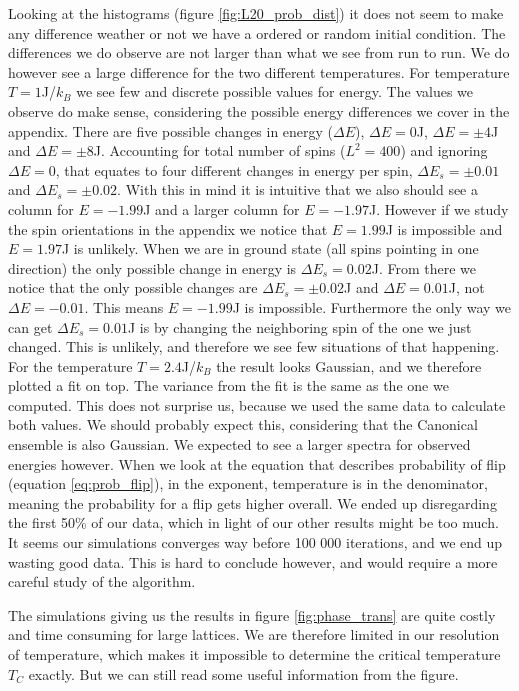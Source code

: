 \documentclass[reprint, english,notitlepage,nofootinbib]{revtex4-1}  %
\begin{document}
Looking at the histograms (figure \ref{fig:L20_prob_dist}) it does not seem to make any difference weather or not we have a ordered or random initial condition. The differences we do observe are not larger than what we see from run to run. We do however see a large difference for the two different temperatures. For temperature $T = 1$J/$k_B$ we see few and discrete possible values for energy. The values we observe do make sense, considering the possible energy differences we cover in the appendix. There are five possible changes in energy ($\Delta E$), $\Delta E = 0$J, $\Delta E = \pm 4$J and $\Delta E = \pm8$J. Accounting for total number of spins ($L^2 = 400$) and ignoring $\Delta E = 0$, that equates to four different changes in energy per spin, $\Delta E_s = \pm0.01$ and $\Delta E_s = \pm0.02$. With this in mind it is intuitive that we also should see a column for $E = -1.99$J and a larger column for $E = -1.97$J. However if we study the spin orientations in the appendix we notice that $E=1.99$J is impossible and $E = 1.97$J is unlikely. When we are in ground state (all spins pointing in one direction) the only possible change in energy is $\Delta E_s=0.02$J. From there we notice that the only possible changes are $\Delta E_s = \pm 0.02$J and $\Delta E = 0.01$J, not $\Delta E = -0.01$. This means $E = -1.99$J is impossible. Furthermore the only way we can get $\Delta E_s=0.01$J is by changing the neighboring spin of the one we just changed. This is unlikely, and therefore we see few situations of that happening. For the temperature $T = 2.4$J/$k_B$ the result looks Gaussian, and we therefore plotted a fit on top. The variance from the fit is the same as the one we computed. This does not surprise us, because we used the same data to calculate both values. We should probably expect this, considering that the Canonical ensemble is also Gaussian. We expected to see a larger spectra for observed energies however. When we look at the equation that describes probability of flip (equation \eqref{eq:prob_flip}), in the exponent, temperature is in the denominator, meaning the probability for a flip gets higher overall. We ended up disregarding the first 50\% of our data, which in light of our other results might be too much. It seems our simulations converges way before 100 000 iterations, and we end up wasting good data. This is hard to conclude however, and would require a more careful study of the algorithm.

The simulations giving us the results in figure \ref{fig:phase_trans} are quite costly and time consuming for large lattices. We are therefore limited in our resolution of temperature, which makes it impossible to determine the critical temperature $T_C$ exactly. But we can still read some useful information from the figure.
\end{document}
